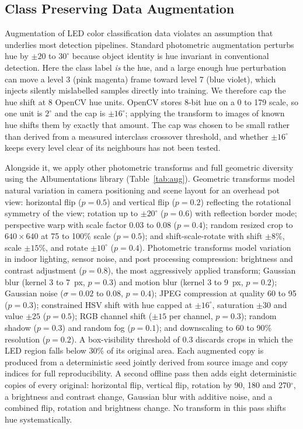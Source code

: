 ﻿\documentclass[journal]{IEEEtran}
\begin{document}
\subsection{Class Preserving Data Augmentation}
\label{sec:aug}
Augmentation of LED color classification data violates an assumption that underlies most detection pipelines. Standard photometric augmentation perturbs hue by $\pm 20$ to $30^{\circ}$ because object identity is hue invariant in conventional detection. Here the class label \emph{is} the hue, and a large enough hue perturbation can move a level 3 (pink magenta) frame toward level 7 (blue violet), which injects silently mislabelled samples directly into training. We therefore cap the hue shift at 8 OpenCV hue units. OpenCV stores 8-bit hue on a 0 to 179 scale, so one unit is $2^{\circ}$ and the cap is $\pm 16^{\circ}$; applying the transform to images of known hue shifts them by exactly that amount. The cap was chosen to be small rather than derived from a measured interclass crossover threshold, and whether $\pm 16^{\circ}$ keeps every level clear of its neighbours has not been tested.

Alongside it, we apply other photometric transforms and full geometric diversity using the Albumentations library (Table~\ref{tab:aug}). Geometric transforms model natural variation in camera positioning and scene layout for an overhead pot view: horizontal flip ($p=0.5$) and vertical flip ($p=0.2$) reflecting the rotational symmetry of the view; rotation up to $\pm 20^{\circ}$ ($p=0.6$) with reflection border mode; perspective warp with scale factor 0.03 to 0.08 ($p=0.4$); random resized crop to $640 \times 640$ at 75 to 100\% scale ($p=0.5$); and shift-scale-rotate with shift $\pm 8\%$, scale $\pm 15\%$, and rotate $\pm 10^{\circ}$ ($p=0.4$). Photometric transforms model variation in indoor lighting, sensor noise, and post processing compression: brightness and contrast adjustment ($p=0.8$), the most aggressively applied transform; Gaussian blur (kernel 3 to 7~px, $p=0.3$) and motion blur (kernel 3 to 9~px, $p=0.2$); Gaussian noise ($\sigma = 0.02$ to $0.08$, $p=0.4$); JPEG compression at quality 60 to 95 ($p=0.3$); constrained HSV shift with hue capped at $\pm 16^{\circ}$, saturation $\pm 30$ and value $\pm 25$ ($p=0.5$); RGB channel shift ($\pm 15$ per channel, $p=0.3$); random shadow ($p=0.3$) and random fog ($p=0.1$); and downscaling to 60 to 90\% resolution ($p=0.2$). A box-visibility threshold of 0.3 discards crops in which the LED region falls below 30\% of its original area. Each augmented copy is produced from a deterministic seed jointly derived from source image and copy indices for full reproducibility. A second offline pass then adds eight deterministic copies of every original: horizontal flip, vertical flip, rotation by 90, 180 and 270$^{\circ}$, a brightness and contrast change, Gaussian blur with additive noise, and a combined flip, rotation and brightness change. No transform in this pass shifts hue systematically.
\end{document}
